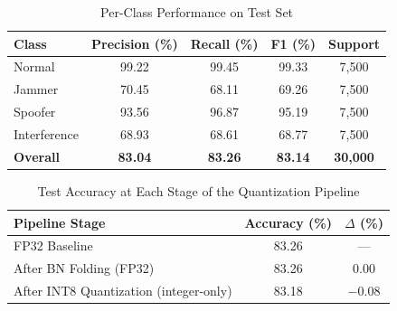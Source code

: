 \documentclass[conference]{IEEEtran}
\begin{document}
\begin{table}[t]
\renewcommand{\arraystretch}{1.15}
\caption{Per-Class Performance on Test Set}
\label{tab:perclass}
\centering
\footnotesize
\begin{tabular}{lcccc}
\toprule
\textbf{Class} & \textbf{Precision (\%)} & \textbf{Recall (\%)} & \textbf{F1 (\%)} & \textbf{Support} \\
\midrule
Normal      & 99.22 & 99.45 & 99.33 & 7,500 \\
Jammer      & 70.45 & 68.11 & 69.26 & 7,500 \\
Spoofer     & 93.56 & 96.87 & 95.19 & 7,500 \\
Interference& 68.93 & 68.61 & 68.77 & 7,500 \\
\midrule
\textbf{Overall} & \textbf{83.04} & \textbf{83.26} & \textbf{83.14} & \textbf{30,000} \\
\bottomrule
\end{tabular}
\end{table}
\begin{table}[t]
\renewcommand{\arraystretch}{1.15}
\caption{Test Accuracy at Each Stage of the Quantization Pipeline}
\label{tab:quant}
\centering
\footnotesize
\begin{tabular}{lcc}
\toprule
\textbf{Pipeline Stage} & \textbf{Accuracy (\%)} & \textbf{$\Delta$ (\%)} \\
\midrule
FP32 Baseline  & 83.26 & --- \\
After BN Folding (FP32) & 83.26 & 0.00 \\
After INT8 Quantization (integer-only) & 83.18 & $-$0.08 \\
\bottomrule
\end{tabular}
\end{table}
\end{document}
